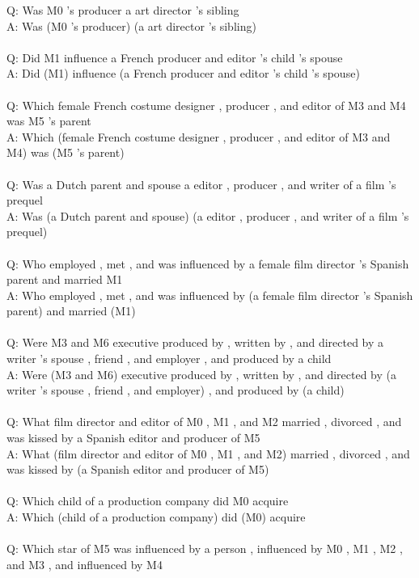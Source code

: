 \documentclass{article} \usepackage{iclr2022_conference,times}
\newcommand{\prompt}[1]{{\footnotesize \textsf{#1}}}
\begin{document}
\prompt{Q: Was M0 's producer a art director 's sibling \\
A: Was (M0 's producer) (a art director 's sibling) \\
 \\
Q: Did M1 influence a French producer and editor 's child 's spouse \\
A: Did (M1) influence (a French producer and editor 's child 's spouse) \\
 \\
Q: Which female French costume designer , producer , and editor of M3 and M4 was M5 's parent \\
A: Which (female French costume designer , producer , and editor of M3 and M4) was (M5 's parent) \\
 \\
Q: Was a Dutch parent and spouse a editor , producer , and writer of a film 's prequel \\
A: Was (a Dutch parent and spouse) (a editor , producer , and writer of a film 's prequel) \\
 \\
Q: Who employed , met , and was influenced by a female film director 's Spanish parent and married M1 \\
A: Who employed , met , and was influenced by (a female film director 's Spanish parent) and married (M1) \\
 \\
Q: Were M3 and M6 executive produced by , written by , and directed by a writer 's spouse , friend , and employer , and produced by a child \\
A: Were (M3 and M6) executive produced by , written by , and directed by (a writer 's spouse , friend , and employer) , and produced by (a child) \\
 \\
Q: What film director and editor of M0 , M1 , and M2 married , divorced , and was kissed by a Spanish editor and producer of M5 \\
A: What (film director and editor of M0 , M1 , and M2) married , divorced , and was kissed by (a Spanish editor and producer of M5) \\
 \\
Q: Which child of a production company did M0 acquire \\
A: Which (child of a production company) did (M0) acquire \\
 \\
Q: Which star of M5 was influenced by a person , influenced by M0 , M1 , M2 , and M3 , and influenced by M4 \\
}
\end{document}
